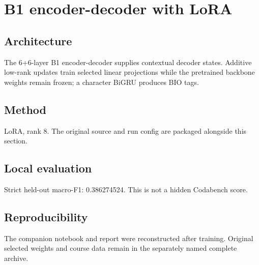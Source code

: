 \section{B1 encoder-decoder with LoRA}
\subsection{Architecture}
The 6+6-layer B1 encoder-decoder supplies contextual decoder states. Additive low-rank updates train selected linear projections while the pretrained backbone weights remain frozen; a character BiGRU produces BIO tags.
\subsection{Method}
LoRA, rank 8. The original source and run config are packaged alongside this section.
\subsection{Local evaluation}
Strict held-out macro-F1: 0.386274524. This is not a hidden Codabench score.
\subsection{Reproducibility}
The companion notebook and report were reconstructed after training. Original selected weights and course data remain in the separately named complete archive.
